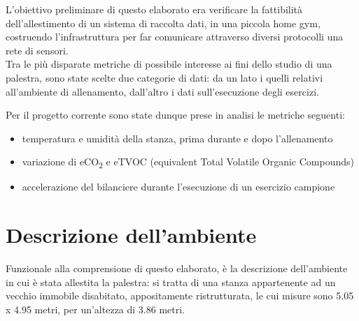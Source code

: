 \documentclass[fleqn,10pt]{SelfArx} %
\begin{document}





L'obiettivo preliminare di questo elaborato era verificare la fattibilità dell'allestimento di un sistema di 
raccolta dati, in una piccola home gym, costruendo l'infrastruttura per far comunicare 
attraverso diversi protocolli una rete di sensori.\\

Tra le più disparate metriche di possibile interesse ai fini dello studio di una palestra, 
sono state scelte due categorie di dati: da un lato i quelli relativi all'ambiente di allenamento, 
dall'altro i dati sull'esecuzione degli esercizi.

Per il progetto corrente sono state dunque prese in analisi le metriche seguenti:

\begin{itemize}[noitemsep] %
	\item temperatura e umidità della stanza, prima durante e dopo l'allenamento
	\item variazione di eCO\textsubscript{2} e eTVOC (equivalent Total Volatile Organic Compounds)
	\item accelerazione del bilanciere durante l'esecuzione di un esercizio campione
\end{itemize}

\section{Descrizione dell'ambiente}

Funzionale alla comprensione di questo elaborato, è la descrizione dell'ambiente in cui è stata allestita 
la palestra: si tratta di una stanza appartenente ad un vecchio immobile disabitato, appositamente 
ristrutturata, le cui misure sono 5.05 x 4.95 metri, per un'altezza di 3.86 metri. \\
\end{document}
